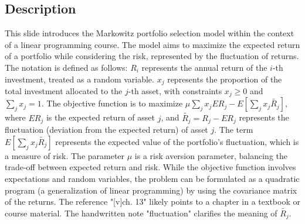 \documentclass{article}%
\begin{document}
\subsection{Description}%
This slide introduces the Markowitz portfolio selection model within the context of a linear programming course. The model aims to maximize the expected return of a portfolio while considering the risk, represented by the fluctuation of returns.  The notation is defined as follows: $R_i$ represents the annual return of the $i$-th investment, treated as a random variable. $x_j$ represents the proportion of the total investment allocated to the $j$-th asset, with constraints $x_j \ge 0$ and $\sum_j x_j = 1$. The objective function is to maximize $\mu \sum_j x_j ER_j - E[\sum_j x_j \tilde{R_j}]$, where $ER_j$ is the expected return of asset $j$, and $\tilde{R_j} = R_j - ER_j$ represents the fluctuation (deviation from the expected return) of asset $j$. The term $E[\sum_j x_j \tilde{R_j}]$ represents the expected value of the portfolio's fluctuation, which is a measure of risk.  The parameter $\mu$ is a risk aversion parameter, balancing the trade-off between expected return and risk.  While the objective function involves expectations and random variables, the problem can be formulated as a quadratic program (a generalization of linear programming) by using the covariance matrix of the returns. The reference "[v]ch. 13" likely points to a chapter in a textbook or course material. The handwritten note "fluctuation" clarifies the meaning of $\tilde{R_j}$.%
\end{document}
